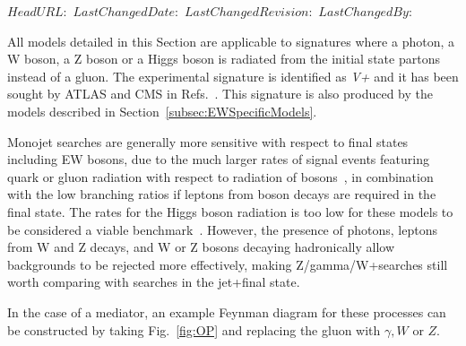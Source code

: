 \svnidlong
{$HeadURL: $}
{$LastChangedDate: $}
{$LastChangedRevision: $}
{$LastChangedBy: $}

All models detailed in this Section are applicable to signatures where 
a photon, a W boson, a Z boson or a Higgs boson
is radiated from the initial state partons instead of a gluon. 
The experimental signature is identified as \textit{V+\MET} and it
has been sought by ATLAS and CMS in Refs.~\cite{Khachatryan:2014rwa,Aad:2014tda,Khachatryan:2014tva,ATLAS:2014wra,Aad:2013oja,Aad:2014vka}. 
This signature is also produced by the models described in 
Section~\ref{subsec:EWSpecificModels}. 

Monojet searches are generally more sensitive
with respect to final states including EW bosons, due to the much
larger rates of signal events featuring quark or gluon radiation with
respect to radiation of bosons~\cite{Zhou:2013fla},
in combination with the low branching ratios if leptons from
boson decays are required in the final state.
The rates for the Higgs boson radiation is too low for these models
to be considered a viable benchmark~\cite{Carpenter:2013xra}.
However, the presence of photons,
leptons from W and Z decays,
and W or Z bosons decaying hadronically
allow backgrounds to be rejected more effectively,
making Z/gamma/W+\MET searches
still worth comparing with searches in the jet+\MET final state.

In the case of a \spinone mediator,
an example Feynman diagram for these processes can be constructed by taking
Fig.~\ref{fig:OP} and replacing the gluon with $\gamma,W$ or $Z$.

